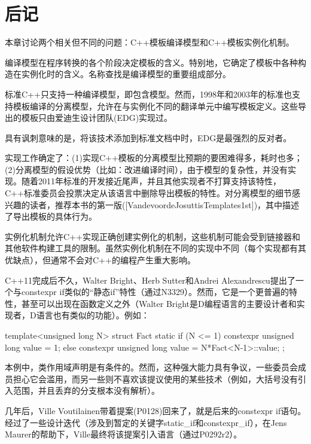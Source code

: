 \section{后记}
本章讨论两个相关但不同的问题：C++模板编译模型和C++模板实例化机制。

编译模型在程序转换的各个阶段决定模板的含义。特别地，它确定了模板中各种构造在实例化时的含义。名称查找是编译模型的重要组成部分。

标准C++只支持一种编译模型，即包含模型。然而，1998年和2003年的标准也支持模板编译的分离模型，允许在与实例化不同的翻译单元中编写模板定义。这些导出的模板只由爱迪生设计团队(EDG)实现过。

\begin{notice}
具有讽刺意味的是，将该技术添加到标准文档中时，EDG是最强烈的反对者。
\end{notice}

实现工作确定了：(1)实现C++模板的分离模型比预期的要困难得多，耗时也多；(2)分离模型的假设优势（比如：改进编译时间），由于模型的复杂性，并没有实现。随着2011年标准的开发接近尾声，并且其他实现者不打算支持该特性，C++标准委员会投票决定从该语言中删除导出模板的特性。对分离模型的细节感兴趣的读者，推荐本书的第一版([VandevoordeJosuttisTemplates1st])，其中描述了导出模板的具体行为。

实例化机制允许C++实现正确创建实例化的机制，这些机制可能会受到链接器和其他软件构建工具的限制。虽然实例化机制在不同的实现中不同（每个实现都有其优缺点），但通常不会对C++的编程产生重大影响。

C++11完成后不久，Walter Bright、Herb Sutter和Andrei Alexandrescu提出了一个与constexpr if类似的“静态if”特性（通过N3329）。然而，它是一个更普遍的特性，甚至可以出现在函数定义之外（Walter Bright是D编程语言的主要设计者和实现者，D语言也有类似的功能）。例如：

\begin{cpp}
template<unsigned long N>
struct Fact {
	static if (N <= 1) {
		constexpr unsigned long value = 1;
	} else {
		constexpr unsigned long value = N*Fact<N-1>::value;
	}
};
\end{cpp}

本例中，类作用域声明是有条件的。然而，这种强大能力具有争议，一些委员会成员担心它会滥用，而另一些则不喜欢该提议使用的某些技术（例如，大括号没有引入范围，并且丢弃的分支根本没有解析）。

几年后，Ville Voutilainen带着提案(P0128)回来了，就是后来的constexpr if语句。经过了一些设计迭代（涉及到暂定的关键字static\_if和constexpr\_if），在Jens Maurer的帮助下，Ville最终将该提案引入语言（通过P0292r2）。



